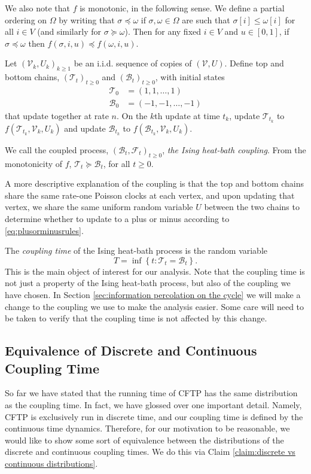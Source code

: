 	We also note that $f$ is monotonic, in the following sense. We define a partial ordering on $\Omega$ by writing that $\sigma \preceq \omega$ if $\sigma, \omega \in \Omega$ are such that $\sigma[i] \leq \omega[i]$ for all $i \in V$ (and similarly for $\sigma \succeq \omega$). Then for any fixed $i \in V$ and $u \in [0,1]$, if $\sigma \preceq \omega$ then $f(\sigma, i, u) \preceq f(\omega, i, u)$.
	
	Let $(\mathscr{V}_k, U_k)_{k \geq 1}$ be an i.i.d. sequence of copies of $(\mathscr{V}, U)$. Define top and bottom chains, $(\mathscr{T}_t)_{t\geq0}$ and $(\mathscr{B}_t)_{t\geq0}$, with initial states
	\begin{align}
		\mathscr{T}_0 &= (1, 1, \dots, 1)\\
		\mathscr{B}_0 &= (-1, -1, \dots, -1)
	\end{align}
	that update together at rate $n$. On the $k$th update at time $t_k$, update $\mathscr{T}_{t_k}$ to $f(\mathscr{T}_{t_k}, \mathscr{V}_k, U_k)$ and update $\mathscr{B}_{t_k}$ to $f(\mathscr{B}_{t_k}, \mathscr{V}_k, U_k)$.

	We call the coupled process, $(\mathscr{B}_t, \mathscr{F}_t)_{t\geq0}$, \emph{the Ising heat-bath coupling}. From the monotonicity of $f$, $\mathscr{T}_t \succeq \mathscr{B}_t$, for all $t \geq 0$.

	A more descriptive explanation of the coupling is that the top and bottom chains share the same rate-one Poisson clocks at each vertex, and upon updating that vertex, we share the same uniform random variable $U$ between the two chains to determine whether to update to a plus or minus according to \eqref{eq:plusorminusrules}.

	The \emph{coupling time} of the Ising heat-bath process is the random variable
	\begin{equation}
		T = \inf \left\{t : \mathscr{T}_t = \mathscr{B}_t \right\}.	
	\end{equation}
	This is the main object of interest for our analysis. Note that the coupling time is not just a property of the Ising heat-bath process, but also of the coupling we have chosen. In Section \ref{sec:information percolation on the cycle} we will make a change to the coupling we use to make the analysis easier. Some care will need to be taken to verify that the coupling time is not affected by this change.

	\subsection{Equivalence of Discrete and Continuous Coupling Time}
	So far we have stated that the running time of CFTP has the same distribution as the coupling time. In fact, we have glossed over one important detail. Namely, CFTP is exclusively run in discrete time, and our coupling time is defined by the continuous time dynamics. Therefore, for our motivation to be reasonable, we would like to show some sort of equivalence between the distributions of the discrete and continuous coupling times. We do this via Claim \ref{claim:discrete vs continuous distributions}.

